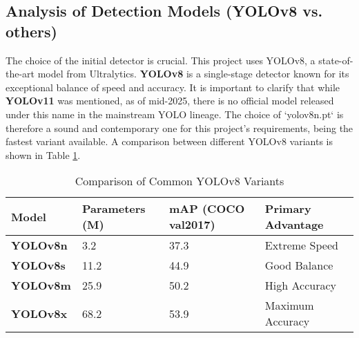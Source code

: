 \documentclass[12pt, a4paper]{article}
\begin{document}
\subsection{Analysis of Detection Models (YOLOv8 vs. others)}
The choice of the initial detector is crucial. This project uses YOLOv8, a state-of-the-art model from Ultralytics. \textbf{YOLOv8} is a single-stage detector known for its exceptional balance of speed and accuracy. It is important to clarify that while \textbf{YOLOv11} was mentioned, as of mid-2025, there is no official model released under this name in the mainstream YOLO lineage. The choice of `yolov8n.pt` is therefore a sound and contemporary one for this project's requirements, being the fastest variant available. A comparison between different YOLOv8 variants is shown in Table \ref{tab:yolo_comparison}.

\begin{table}[H]
\centering
\caption{Comparison of Common YOLOv8 Variants}
\label{tab:yolo_comparison}
\begin{tabular}{@{}llll@{}}
\toprule
\textbf{Model} & \textbf{Parameters (M)} & \textbf{mAP (COCO val2017)} & \textbf{Primary Advantage} \\ \midrule
\textbf{YOLOv8n} & 3.2 & 37.3 & Extreme Speed \\
\textbf{YOLOv8s} & 11.2 & 44.9 & Good Balance \\
\textbf{YOLOv8m} & 25.9 & 50.2 & High Accuracy \\
\textbf{YOLOv8x} & 68.2 & 53.9 & Maximum Accuracy \\ \bottomrule
\end{tabular}
\end{table}
\end{document}
